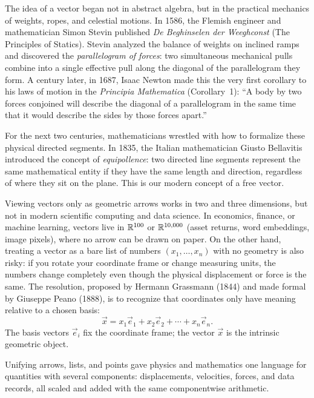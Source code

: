 \begin{historybox}
The idea of a vector began not in abstract algebra, but in the practical mechanics of weights, ropes, and celestial motions.
In 1586, the Flemish engineer and mathematician Simon Stevin published \emph{De Beghinselen der Weeghconst}
(The Principles of Statics). Stevin analyzed the balance of weights on inclined ramps and discovered the
\emph{parallelogram of forces}: two simultaneous mechanical pulls combine into a single effective pull along
the diagonal of the parallelogram they form. A century later, in 1687, Isaac Newton made this the very first
corollary to his laws of motion in the \emph{Principia Mathematica} (Corollary~1): ``A body by two forces conjoined
will describe the diagonal of a parallelogram in the same time that it would describe the sides by those forces
apart.''

For the next two centuries, mathematicians wrestled with how to formalize these physical directed segments.
In 1835, the Italian mathematician Giusto Bellavitis introduced the concept of \emph{equipollence}: two directed
line segments represent the same mathematical entity if they have the same length and direction, regardless of
where they sit on the plane. This is our modern concept of a free vector.

Viewing vectors only as geometric arrows works in two and three dimensions,
but not in modern scientific computing and data science. In
economics, finance, or machine learning, vectors live in $\mathbb{R}^{100}$ or $\mathbb{R}^{10{,}000}$
(asset returns, word embeddings, image pixels), where no arrow can be drawn on paper.
On the other hand, treating a vector as a bare list of numbers $(x_1, \dots, x_n)$
with no geometry is also risky: if you rotate your coordinate frame or change measuring units,
the numbers change completely even though the physical displacement or force is the same.
The resolution, proposed by Hermann Grassmann (1844) and made formal by Giuseppe Peano (1888),
is to recognize that coordinates only have meaning relative to a chosen basis:
\[
  \vec{x} = x_1\vec{e}_1 + x_2\vec{e}_2 + \cdots + x_n\vec{e}_n.
\]
The basis vectors $\vec{e}_i$ fix the coordinate frame; the vector $\vec{x}$ is the intrinsic geometric object.

Unifying arrows, lists, and points gave physics and mathematics one language
for quantities with several components: displacements, velocities, forces, and data
records, all scaled and added with the same componentwise arithmetic.
\end{historybox}

